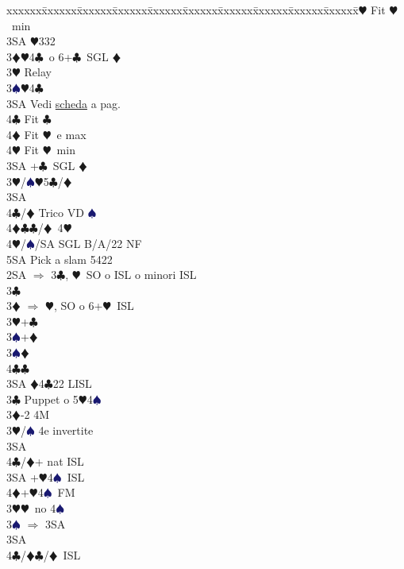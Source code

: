 \documentclass[a4paper,italian]{article}
\newcommand{\BC}{\textcolor{OliveGreen}{$\clubsuit$}}
\newcommand{\BD}{\textcolor{RedOrange}{$\vardiamondsuit$}}
\newcommand{\BH}{\textcolor{Red2}{$\varheartsuit${}}}
\newcommand{\BS}{\textcolor{MidnightBlue}{$\spadesuit${}}}
\newenvironment{bidtable}
{\begin{tabbing}

    xxxxxx\=xxxxxx\=xxxxxx\=xxxxxx\=xxxxxx\=xxxxxx\=xxxxxx\=xxxxxx\=xxxxxx\=xxxxxx\=\kill}
{\end{tabbing} }%
\begin{document}
\begin{multicols}{2}
\begin{bidtable}
        4\BH\> Fit \BH\ min\-\\
        3SA \BH 332\-\-\\
        3\BD {}\BH 4\BC\ o 6+\BC\ SGL \BD \+\\
        3\BH \> Relay\+\\
        3\BS {}\BH 4\BC\+\\
        3SA\> Vedi \hyperref[Riapertura3SA]{scheda} a pag. \pageref{Riapertura3SA}\\
        4\BC\> Fit \BC\\
        4\BD\> Fit \BH\ e max\\
        4\BH\> Fit \BH\ min\-\\
        3SA +\BC\ SGL \BD \-\-\\
        3\BH/\BS {}\BH 5\BC /\BD \+\\
        3SA\+\\
        4\BC/\BD \> Trico VD \BS \\
        4\BD\BC {}\BC /\BD\ 4\BH \\
        4\BH/\BS/SA\> \> SGL B/A/22 NF\\
        5SA \> Pick a slam 5422\-\-\-\-\\
        2SA \> $\Rightarrow$ 3\BC , \BH\ SO o ISL o minori ISL\+\\
        3\BC\+\\
        3\BD \> $\Rightarrow$ \BH , SO o 6+\BH\ ISL\\
        3\BH {}+\BC \+\\
        3\BS {}+\BD \-\\
        3\BS {}\BD \+\\
        4\BC {}\BC \-\\
        3SA \BD 4\BC 22 LISL\-\-\\
        3\BC \> Puppet o 5\BH 4\BS \+\\
        3\BD {}-2 4M\+\\
        3\BH/\BS \> 4e invertite\+\\
        3SA\+\\
        4\BC/\BD {}+ nat ISL\-\-\\
        3SA +\BH4\BS\ ISL\\
        4\BD {}+\BH4\BS\ FM\-\\
        3\BH {}\BH\ no 4\BS \+\\
        3\BS \> $\Rightarrow$ 3SA\+\\
        3SA\+\\
        4\BC/\BD {}\BC /\BD\ ISL\\

\end{bidtable}
\end{multicols}
\end{document}
